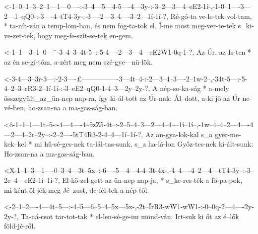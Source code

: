 




  {<-1--0--1--3--2--1---1---0----:-3--4---5---4-5----4---3y-:-3--2---3---4--eE2-1í-,-1-0--1----3---2---1--qQ0-:-3----4--tT4-3y-:-3----2---3--4----3--2---1í-1í-?,}
  {  Ré-gó-ta ve-le-tek vol-tam, * ta-nít-ván a temp-lom-ban, és nem fog-ta-tok el.  Í-me most meg-ver-te-tek   s_ki-ve-zet-tek, hogy meg-fe-szít-se-tek en-gem.}

  {<-1--1---3--1--0---¨-3--4--3--4t-5--:-5-4----2---3---4---eE2W1-0q-1-?,}
  {  Az Úr, az Is-ten * az én se-gí-tőm, a-zért meg nem szé-gye---nü-lök.}


  {<-3-4---3--3r-3---:-2-3----£----------------3---4t--4-:-2---3--4--3----2--1w-2--,-34t-5---:-5-4--2--3--rR3-2--1í-1í-:-3--eE2--qQ0-1-4--3---2y--2y-?,}
  {  A nép-so-ka-ság * a-mely összegyűlt_az_ün-nep nap-ra, így ki-ál-tott az Úr-nak: Ál--dott, a-ki jő az Úr  ne-vé-ben, ho-zsan-na  a ma-gas-ság-ban.}

  {<ô-1--1--1---1t--5-:-4---4----4--5zZ5-4t--:-2--5--4--3---2---4--4---1í--1í--,-1w--4--4--2---4----4---2---4--2r--2y--:-2--2----5tT4R3-2-4--4---1í--1í-?,}
  {   Az an-gya-lok-kal s_a gyer-me-kek--kel * mi hű-sé-ges-nek ta-lál-tas-sunk, s_a ha-lá-lon Győz-tes-nek ki-ált-sunk: Ho-zsan-na     a ma-gas-ság-ban.}


  {<X-1--1--3---1----0--3--4---3t--5x--:-6----5---4---4-4--3t-4x-,-4--4----4--2---4---tT4-3y--:-3--2e--4---eE2-1í--1í-?,}
  {   El-kö-zel-gett az ün-nep nap-ja, * s_ke-res-ték a fő-pa-pok, mi-ként öl-jék meg Jé--zust, de fél-tek a   nép-től.}

  {<-2--1--2----4---4t--5---:-4--5---6--5--4--5x---5x-,-2t--ÏrR3-wW1-wW1-:-0--0q-2---4----2y-2y-?,}
  {  Ta-ná-csot tar-tot-tak * el-len-sé-ge-im mond-ván: Irt-suk  ki  őt    az é--lők föld-jé-ről.}

